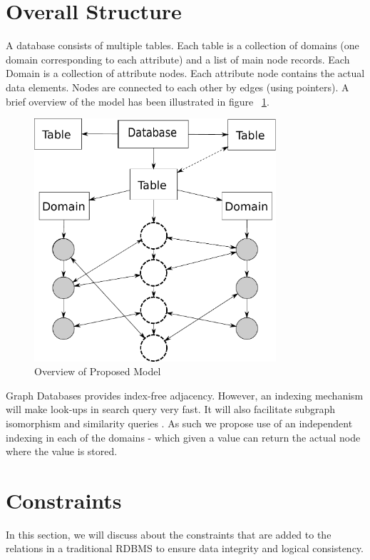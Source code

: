 \documentclass[12pt, oneside]{book}
\begin{document}
\section{Overall Structure}
A database consists of multiple tables. Each table is a collection of domains (one domain corresponding to each attribute) and a list of main node records. Each Domain is a collection of attribute nodes. Each attribute node contains the actual data elements. Nodes are connected to each other by edges (using pointers). A brief overview of the model has been illustrated in figure ~\ref{fig:overview}. \\
\begin{figure}[t]
 \centering
 \includegraphics[width=0.8\textwidth]{pics/model.pdf}
 \caption{Overview of Proposed Model}
 \label{fig:overview}
\end{figure}
Graph Databases provides index-free adjacency. However, an indexing mechanism will make look-ups in search query very fast. It will also facilitate subgraph isomorphism and similarity queries \cite{indexing}. As such we propose use of an independent indexing in each of the domains - which given a value can return the actual node where the value is stored.
\section{Constraints}
In this section, we will discuss about the constraints that are added to the relations in a traditional RDBMS to ensure data integrity and logical consistency.
\end{document}
